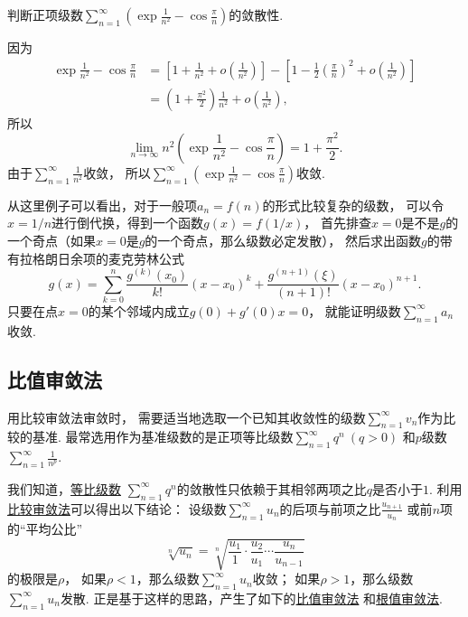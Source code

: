 \begin{example}
判断正项级数\(\sum_{n=1}^\infty \left(\exp\frac1{n^2}-\cos\frac\pi{n}\right)\)的敛散性.
\begin{solution}
因为\begin{align*}
	\exp\frac1{n^2}-\cos\frac\pi{n}
	&= \left[1+\frac1{n^2}+o\left(\frac1{n^2}\right)\right]
	- \left[1-\frac12\left(\frac\pi{n}\right)^2+o\left(\frac1{n^2}\right)\right] \\
	&= \left(1+\frac{\pi^2}2\right) \frac1{n^2} + o\left(\frac1{n^2}\right),
\end{align*}
所以\[
	\lim_{n\to\infty} n^2 \left(\exp\frac1{n^2}-\cos\frac\pi{n}\right)
	= 1+\frac{\pi^2}2.
\]
由于\(\sum_{n=1}^\infty \frac1{n^2}\)收敛，
所以\(\sum_{n=1}^\infty \left(\exp\frac1{n^2}-\cos\frac\pi{n}\right)\)收敛.
\end{solution}
\end{example}
\begin{remark}
从这里例子可以看出，对于一般项\(a_n = f(n)\)的形式比较复杂的级数，
可以令\(x = 1/n\)进行倒代换，得到一个函数\(g(x) = f(1/x)\)，
首先排查\(x=0\)是不是\(g\)的一个奇点（如果\(x=0\)是\(g\)的一个奇点，那么级数必定发散），
然后求出函数\(g\)的带有拉格朗日余项的麦克劳林公式\[
	g(x) = \sum_{k=0}^n \frac{g^{(k)}(x_0)}{k!} (x-x_0)^k
	+ \frac{g^{(n+1)}(\xi)}{(n+1)!} (x-x_0)^{n+1}.
\]
只要在点\(x=0\)的某个邻域内成立\(g(0) + g'(0) x = 0\)，
就能证明级数\(\sum_{n=1}^\infty a_n\)收敛.
\end{remark}

\subsection{比值审敛法}
用比较审敛法审敛时，
需要适当地选取一个已知其收敛性的级数\(\sum_{n=1}^\infty v_n\)作为比较的基准.
最常选用作为基准级数的是正项等比级数\(\sum_{n=1}^\infty q^n\ (q>0)\)
和\(p\)级数\(\sum_{n=1}^\infty \frac1{n^p}\).

我们知道，\hyperref[example:无穷级数.等比级数的收敛性]{等比级数}
\(\sum_{n=1}^\infty q^n\)的敛散性只依赖于其相邻两项之比\(q\)是否小于\(1\).
利用\hyperref[theorem:无穷级数.正项级数的比较审敛法]{比较审敛法}可以得出以下结论：
设级数\(\sum_{n=1}^\infty u_n\)的后项与前项之比\(\frac{u_{n+1}}{u_n}\)
或前\(n\)项的“平均公比”\[
	\sqrt[n]{u_n}
	= \sqrt[n]{\frac{u_1}1\cdot\frac{u_2}{u_1}\dotsm\frac{u_n}{u_{n-1}}}
\]的极限是\(\rho\)，
如果\(\rho<1\)，那么级数\(\sum_{n=1}^\infty u_n\)收敛；
如果\(\rho>1\)，那么级数\(\sum_{n=1}^\infty u_n\)发散.
正是基于这样的思路，产生了如下的\hyperref[theorem:无穷级数.正项级数的比值审敛法]{比值审敛法}%
和\hyperref[theorem:无穷级数.正项级数的根值审敛法]{根值审敛法}.

